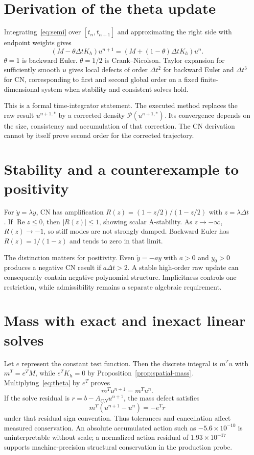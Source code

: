 \section{Derivation of the theta update}
Integrating~\eqref{eq:semi} over $[t_n,t_{n+1}]$ and approximating the right side with endpoint weights gives
\begin{equation}\label{eq:theta}
(M-\theta\Delta tK_h)u^{n+1}=(M+(1-\theta)\Delta tK_h)u^n.
\end{equation}
$\theta=1$ is backward Euler. $\theta=1/2$ is Crank--Nicolson. Taylor expansion for sufficiently smooth $u$ gives local defects of order $\Delta t^2$ for backward Euler and $\Delta t^3$ for CN, corresponding to first and second global order on a fixed finite-dimensional system when stability and consistent solves hold.

This is a formal time-integrator statement. The executed method replaces the raw result $u^{n+1,*}$ by a corrected density $\mathcal P(u^{n+1,*})$. Its convergence depends on the size, consistency and accumulation of that correction. The CN derivation cannot by itself prove second order for the corrected trajectory.

\section{Stability and a counterexample to positivity}
For $\dot y=\lambda y$, CN has amplification $R(z)=(1+z/2)/(1-z/2)$ with $z=\lambda\Delta t$. If $\operatorname{Re}z\le0$, then $|R(z)|\le1$, showing scalar A-stability. As $z\to-\infty$, $R(z)\to-1$, so stiff modes are not strongly damped. Backward Euler has $R(z)=1/(1-z)$ and tends to zero in that limit.

The distinction matters for positivity. Even $\dot y=-ay$ with $a>0$ and $y_0>0$ produces a negative CN result if $a\Delta t>2$. A stable high-order raw update can consequently contain negative polynomial structure. Implicitness controls one restriction, while admissibility remains a separate algebraic requirement.

\section{Mass with exact and inexact linear solves}
Let $e$ represent the constant test function. Then the discrete integral is $m^Tu$ with $m^T=e^TM$, while $e^TK_h=0$ by Proposition~\ref{prop:spatial-mass}. Multiplying~\eqref{eq:theta} by $e^T$ proves
\begin{equation}\label{eq:cn-mass}
m^Tu^{n+1}=m^Tu^n.
\end{equation}
If the solve residual is $r=b-A_{CN}u^{n+1}$, the mass defect satisfies
\begin{equation}
m^T(u^{n+1}-u^n)=-e^Tr
\end{equation}
under that residual sign convention. Thus tolerances and cancellation affect measured conservation. An absolute accumulated action such as $-5.6\times10^{-10}$ is uninterpretable without scale; a normalized action residual of $1.93\times10^{-17}$ supports machine-precision structural conservation in the production probe.

